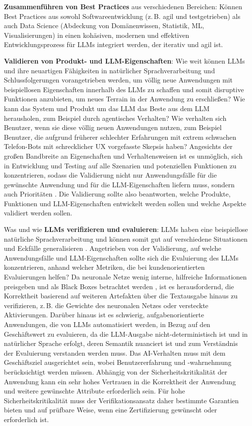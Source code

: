 \documentclass[twocolumn]{article}
\begin{document}
\begin{compactenum}
\item \textbf{Zusammenführen von Best Practices} aus verschiedenen Bereichen: Können Best Practices aus sowohl Softwareentwicklung (z.\,B. agil und testgetrieben) als auch Data Science (Abdeckung von Domänenwissen, Statistik, ML, Visualisierungen) in einen kohäsiven, modernen und effektiven Entwicklungsprozess für LLMs integriert werden, der iterativ und agil ist.
\item \textbf{Validieren von Produkt- und LLM-Eigenschaften}: Wie weit können LLMs und ihre neuartigen Fähigkeiten in natürlicher Sprachverarbeitung und Schlussfolgerungen vorangetrieben werden, um völlig neue Anwendungen mit beispiellosen Eigenschaften innerhalb des LLMs zu schaffen und somit disruptive Funktionen anzubieten, um neues Terrain in der Anwendung zu erschließen? Wie kann das System und Produkt um das LLM das Beste aus dem LLM herausholen, zum Beispiel durch agentisches Verhalten? Wie verhalten sich Benutzer, wenn sie diese völlig neuen Anwendungen nutzen, zum Beispiel Benutzer, die aufgrund früherer schlechter Erfahrungen mit extrem schwachen Telefon-Bots mit schrecklicher UX vorgefasste Skepsis haben? Angesichts der großen Bandbreite an Eigenschaften und Verhaltensweisen ist es unmöglich, sich in Entwicklung und Testing auf alle Szenarien und potenziellen Funktionen zu konzentrieren, sodass die Validierung nicht nur Anwendungsfälle für die gewünschte Anwendung und für die LLM-Eigenschaften liefern muss, sondern auch Prioritäten \cite{Röttger24}. Die Validierung sollte also beantworten, welche Produkte, Funktionen und LLM-Eigenschaften entwickelt werden sollen und welche Aspekte validiert werden sollen.
\item Was und wie \textbf{LLMs verifizieren und evaluieren}: LLMs haben eine beispiellose natürliche Sprachverarbeitung und können somit gut auf verschiedene Situationen und Eckfälle generalisieren \cite{Brown20}. Angetrieben von der Validierung, auf welche Anwendungsfälle und LLM-Eigenschaften sollte sich die Evaluierung des LLMs konzentrieren, anhand welcher Metriken, die bei kundenorientierten Evaluierungen helfen? Da neuronale Netze wenig interne, hilfreiche Informationen preisgeben und als Black Boxes betrachtet werden \cite{Chang24}, ist es herausfordernd, die Korrektheit basierend auf weiteren Artefakten über die Textausgabe hinaus zu verifizieren, z.\,B. die Gewichte des neuronalen Netzes oder versteckte Aktivierungen. Darüber hinaus ist es schwierig, aufgabenorientierte Anwendungen, die von LLMs automatisiert werden, in Bezug auf den Geschäftswert zu evaluieren, da die LLM-Ausgabe nicht-deterministisch ist und in natürlicher Sprache erfolgt, deren Semantik nuanciert ist und zum Verständnis der Evaluierung verstanden werden muss. Das AI-Verhalten muss mit dem Geschäftsziel ausgerichtet sein, wobei Benutzererfahrung und -wahrnehmung berücksichtigt werden müssen. Abhängig von der Sicherheitskritikalität der Anwendung kann ein sehr hohes Vertrauen in die Korrektheit der Anwendung und weitere gewünschte Attribute erforderlich sein. Für hohe Sicherheitskritikalität muss der Verifikationsansatz daher bestimmte Garantien bieten und auf prüfbare Weise, wenn eine Zertifizierung gewünscht oder erforderlich ist.

\end{compactenum}
\end{document}
